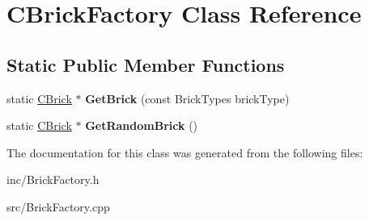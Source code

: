 \hypertarget{classCBrickFactory}{\section{C\-Brick\-Factory Class Reference}
\label{classCBrickFactory}
}
\subsection*{Static Public Member Functions}
\begin{DoxyCompactItemize}
\item 
\hypertarget{classCBrickFactory_aae7645738f3d60ad8ce2cefe03d012f2}{static \hyperlink{classCBrick}{C\-Brick} $\ast$ {\bfseries Get\-Brick} (const Brick\-Types brick\-Type)}\label{classCBrickFactory_aae7645738f3d60ad8ce2cefe03d012f2}

\item 
\hypertarget{classCBrickFactory_ae6f2aa7d151bb01972ac42da029ef5b9}{static \hyperlink{classCBrick}{C\-Brick} $\ast$ {\bfseries Get\-Random\-Brick} ()}\label{classCBrickFactory_ae6f2aa7d151bb01972ac42da029ef5b9}

\end{DoxyCompactItemize}


The documentation for this class was generated from the following files\-:\begin{DoxyCompactItemize}
\item 
inc/Brick\-Factory.\-h\item 
src/Brick\-Factory.\-cpp\end{DoxyCompactItemize}

